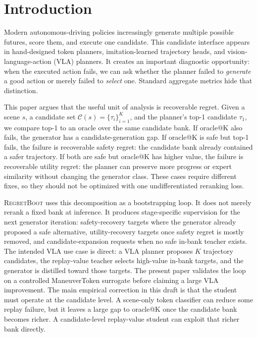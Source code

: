 \documentclass{article}
\newcommand{\method}{\textsc{RegretBoot}}
\begin{document}

\section{Introduction}

Modern autonomous-driving policies increasingly generate multiple possible futures, score
them, and execute one candidate. This candidate interface appears in hand-designed token
planners, imitation-learned trajectory heads, and vision-language-action (VLA) planners.
It creates an important diagnostic opportunity: when the executed action fails, we can ask
whether the planner failed to \emph{generate} a good action or merely failed to
\emph{select} one. Standard aggregate metrics hide that distinction.

This paper argues that the useful unit of analysis is recoverable regret. Given a scene
$s$, a candidate set $\mathcal{C}(s)=\{\tau_i\}_{i=1}^K$, and the planner's top-1
candidate $\tau_1$, we compare top-1 to an oracle over the same candidate bank. If
oracle@K also fails, the generator has a candidate-generation gap. If oracle@K is safe
but top-1 fails, the failure is recoverable safety regret: the candidate bank already
contained a safer trajectory. If both are safe but oracle@K has higher value, the failure
is recoverable utility regret: the planner can preserve more progress or expert
similarity without changing the generator class. These cases require different fixes, so
they should not be optimized with one undifferentiated reranking loss.

\method{} uses this decomposition as a bootstrapping loop. It does not merely rerank a
fixed bank at inference. It produces stage-specific supervision for the next generator
iteration: safety-recovery targets where the generator already proposed a safe
alternative, utility-recovery targets once safety regret is mostly removed, and
candidate-expansion requests when no safe in-bank teacher exists. The intended VLA use
case is direct: a VLA planner proposes $K$ trajectory candidates, the replay-value teacher
selects high-value in-bank targets, and the generator is distilled toward those targets.
The present paper validates the loop on a controlled ManeuverToken surrogate before
claiming a large VLA improvement. The main empirical correction in this draft is that the
student must operate at the candidate level. A scene-only token classifier can reduce some
replay failure, but it leaves a large gap to oracle@K once the candidate bank becomes
richer. A candidate-level replay-value student can exploit that richer bank directly.
\end{document}
